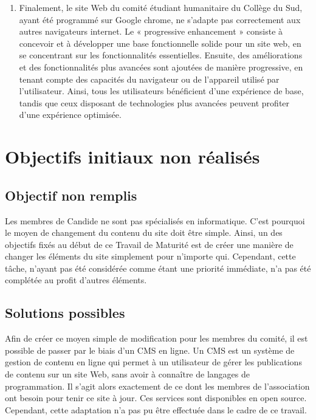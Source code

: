 \documentclass[a4,10pt,french]{sphinxmanual}
\begin{document}
\begin{enumerate}
\item {} 
\sphinxAtStartPar
Finalement, le site Web du comité étudiant humanitaire du Collège du Sud, ayant été programmé sur Google chrome, ne s’adapte pas correctement aux autres navigateurs internet. Le « progressive enhancement » consiste à concevoir et à développer une base fonctionnelle solide pour un site web, en se concentrant sur les fonctionnalités essentielles. Ensuite, des améliorations et des fonctionnalités plus avancées sont ajoutées de manière progressive, en tenant compte des capacités du navigateur ou de l’appareil utilisé par l’utilisateur. Ainsi, tous les utilisateurs bénéficient d’une expérience de base, tandis que ceux disposant de technologies plus avancées peuvent profiter d’une expérience optimisée.

\end{enumerate}


\section{Objectifs initiaux non réalisés}
\label{\detokenize{chapitre-03:objectifs-initiaux-non-realises}}

\subsection{Objectif non remplis}
\label{\detokenize{chapitre-03:objectif-non-remplis}}
\sphinxAtStartPar
Les membres de Candide ne sont pas spécialisés en informatique. C’est pourquoi le moyen de changement du contenu du site doit être simple. Ainsi, un des objectifs fixés au début de ce Travail de Maturité est de créer une manière de changer les éléments du site simplement pour n’importe qui. Cependant, cette tâche, n’ayant pas été considérée comme étant une priorité immédiate, n’a pas été complétée au profit d’autres éléments.


\subsection{Solutions possibles}
\label{\detokenize{chapitre-03:solutions-possibles}}
\sphinxAtStartPar
Afin de créer ce moyen simple de modification pour les membres du comité, il est possible de passer par le biais d’un CMS en ligne. Un CMS est un système de gestion de contenu en ligne qui permet à un utilisateur de gérer les publications de contenu sur un site Web, sans avoir à connaître de langages de programmation. Il s’agit alors exactement de ce dont les membres de l’association ont besoin pour tenir ce site à jour. Ces services sont disponibles en open source. Cependant, cette adaptation n’a pas pu être effectuée dans le cadre de ce travail.
\end{document}
